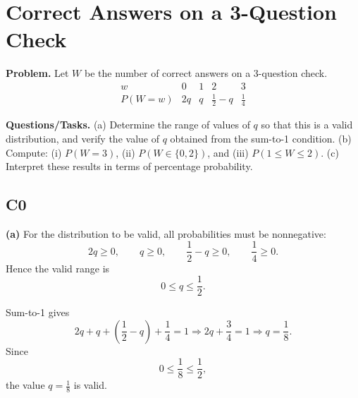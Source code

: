 		\section{Correct Answers on a 3-Question Check}
		
		\textbf{Problem.}
		Let $W$ be the number of correct answers on a 3-question check.
		\[
		\begin{array}{c|cccc}
			w & 0 & 1 & 2 & 3\\
			\hline
			P(W=w) & 2q & q & \frac{1}{2}-q & \frac{1}{4}
		\end{array}
		\]
		
		\textbf{Questions/Tasks.}
		(a) Determine the range of values of $q$ so that this is a valid distribution, and verify the value of $q$ obtained from the sum-to-1 condition.
		(b) Compute: (i) $P(W=3)$, (ii) $P(W\in\{0,2\})$, and (iii) $P(1\le W\le 2)$.
		(c) Interpret these results in terms of percentage probability.
		
		\subsection*{C0}

		\textbf{(a)} For the distribution to be valid, all probabilities must be nonnegative:
		\[
		2q\ge 0,\qquad q\ge 0,\qquad \frac{1}{2}-q\ge 0,\qquad \frac{1}{4}\ge 0.
		\]
		Hence the valid range is
		\[
		0\le q\le \frac{1}{2}.
		\]
		
		Sum-to-1 gives
		\[
		2q+q+\left(\frac{1}{2}-q\right)+\frac{1}{4}=1
		\Rightarrow 2q+\frac{3}{4}=1
		\Rightarrow q=\frac{1}{8}.
		\]
		Since
		\[
		0\le \frac{1}{8}\le \frac{1}{2},
		\]
		the value $q=\frac{1}{8}$ is valid.
		

